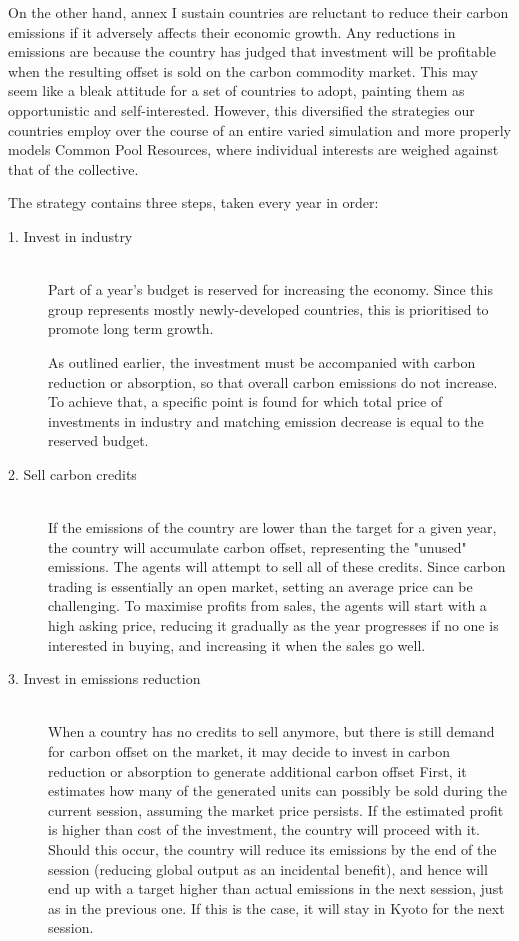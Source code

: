 On the other hand, annex I sustain countries are reluctant to reduce their carbon emissions if it adversely affects their economic growth. Any reductions in emissions are because the country has judged that investment will be profitable when the resulting offset is sold on the carbon commodity market. This may seem like a bleak attitude for a set of countries to adopt, painting them as opportunistic and self-interested. However, this diversified the strategies our countries employ over the course of an entire varied simulation and more properly models Common Pool Resources, where individual interests are weighed against that of the collective.

The strategy contains three steps, taken every year in order:

\begin{description}
\item[1. Invest in industry] \hfill \\
Part of a year's budget is reserved for increasing the economy. Since this group represents mostly newly-developed countries, this is prioritised to promote long term growth.

As outlined earlier, the investment must be accompanied with carbon reduction or absorption, so that overall carbon emissions do not increase. To achieve that, a specific point is found for which total price of investments in industry and matching emission decrease is equal to the reserved budget.

\item[2. Sell carbon credits] \hfill \\
If the emissions of the country are lower than the target for a given year, the country will accumulate carbon offset, representing the "unused" emissions. The agents will attempt to sell all of these credits. Since carbon trading is essentially an open market, setting an average price can be challenging. To maximise profits from sales, the agents will start with a high asking price, reducing it gradually as the year progresses if no one is interested in buying, and increasing it when the sales go well.

\item[3. Invest in emissions reduction] \hfill \\
When a country has no credits to sell anymore, but there is still demand for carbon offset on the market, it may decide to invest in carbon reduction or absorption to generate additional carbon offset First, it estimates how many of the generated units can possibly be sold during the current session, assuming the market price persists. If the estimated profit is higher than cost of the investment, the country will proceed with it. Should this occur, the country will reduce its emissions by the end of the session (reducing global output as an incidental benefit), and hence will end up with a target higher than actual emissions in the next session, just as in the previous one. If this is the case, it will stay in Kyoto for the next session.

\end{description}

